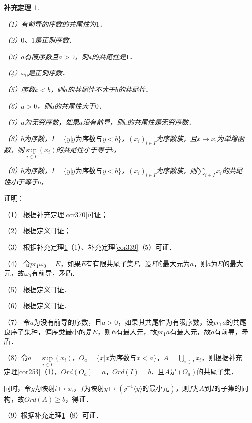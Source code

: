 \documentclass[12pt, a4paper, oneside]{book}
\newtheorem{cor}{补充定理}
\begin{document}
			\begin{cor}\label{cor371}
				\hfill\par
				（1）有前导的序数的共尾性为$1$．
				\par
				（2）$0$、$1$是正则序数．
				\par
				（3）$a$有限序数且$a>0$，则$a$的共尾性是$1$．
				\par
				（4）$\omega_0$是正则序数．
				\par
				（5）序数$a<b$，则$a$的共尾性不大于$b$的共尾性．
				\par
				（6）$a>0$，则$a$的共尾性大于$0$．
				\par
				（7）$a$为无穷序数，如果$a$没有前导，则$a$的共尾性是无穷序数．
				\par
				（8）$b$为序数，$I=\{y|y\text{为序数}\text{与}y<b\}$，$(x_i)_{i\in I}$为序数族，且$x\mapsto x_i$为单增函数，则$\mathop{sup}\limits_{i\in I}(x_i)$的共尾性小于等于$b$，
				\par
				（9）$b$为序数，$I=\{y|y\text{为序数}\text{与}y<b\}$，$(x_i)_{i\in I}$为序数族，则$\sum\limits_{i\in I}x_i$的共尾性小于等于$b$，
			\end{cor}
			证明：
			\par
			（1）	根据补充定理\ref{cor370}可证；
			\par
			（2）	根据定义可证；
			\par
			（3）	根据补充定理\ref{cor371}（1）、补充定理\ref{cor339}（5）可证．
			\par
			（4）	令$pr_1\omega_0=E$，如果$E$有有限共尾子集$F$，设$F$的最大元为$a$，则$a$为$E$的最大元，故$\omega_0$有前导，矛盾．
			\par
			（5）	根据定义可证．
			\par
			（6）	根据定义可证．
			\par
			（7）	令$a$为没有前导的序数，且$a>0$，如果其共尾性为有限序数，设$pr_1a$的共尾良序子集种，偏序类最小的是$E$，则$E$有最大元，故$pr_1a$有最大元，故$a$有前导，矛盾．
			\par
			（8）令$a=\mathop{sup}\limits_{i\in I}(x_i)$，$O_a=\{x|x\text{为序数}\text{与}x<a\}$，$A=\bigcup\limits_{i\in I}x_i$，则根据补充定理\ref{cor253}（1），$Ord(O_a)=a$，$Ord(I)=b$．且$A$是$(O_a)$的共尾子集．
			\par
			同时，令$g$为映射$i\mapsto x_i$，$f$为映射$y\mapsto (g^{-1}\langle y \rangle \text{的最小元})$，则$f$为$A$到$I$的子集的同构，故$Ord(A)\geq b$，得证．
			\par
			（9）根据补充定理\ref{cor371}（8）可证．
			
\end{document}
